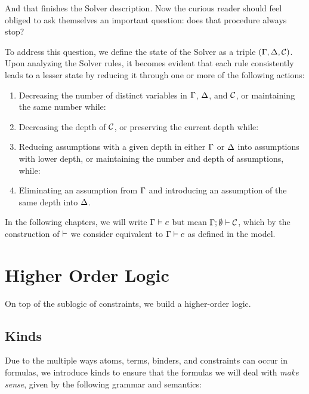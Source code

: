 \documentclass[english, mgr]{iithesis}
\renewcommand{\it}[1]{\textit{#1}}
\begin{document}
And that finishes the Solver description.
Now the curious reader should feel obliged to ask themselves an important question:
does that procedure always stop?

To address this question, we define the state of the Solver as a triple $(\Gamma, \Delta, \mathcal{C})$.
Upon analyzing the Solver rules, it becomes evident that each rule consistently
leads to a lesser state by reducing it through one or more of the following actions:
\begin{enumerate}[noitemsep]
  \item Decreasing the number of distinct variables in $\Gamma$, $\Delta$, and $\mathcal{C}$,
  or maintaining the same number while:
  \item Decreasing the depth of $\mathcal{C}$,
  or preserving the current depth while:
  \item Reducing assumptions with a given depth in either $\Gamma$ or $\Delta$ into assumptions with lower depth,
  or maintaining the number and depth of assumptions, while:
  \item Eliminating an assumption from $\Gamma$ and introducing an assumption of the same depth into $\Delta$.
\end{enumerate}

In the following chapters, we will write $\Gamma \vDash c$
but mean $\Gamma ; \emptyset \vdash \mathcal{C}$,
which by the construction of $\vdash$ we consider equivalent
to $\Gamma \vDash c$ as defined in the model.
\chapter{Higher Order Logic}
On top of the sublogic of constraints, we build a higher-order logic.
\section{Kinds}
Due to the multiple ways atoms, terms, binders, and constraints can occur in
formulas, we introduce kinds to ensure that the formulas we will deal with \it{make sense},
given by the following grammar and semantics:
\end{document}
